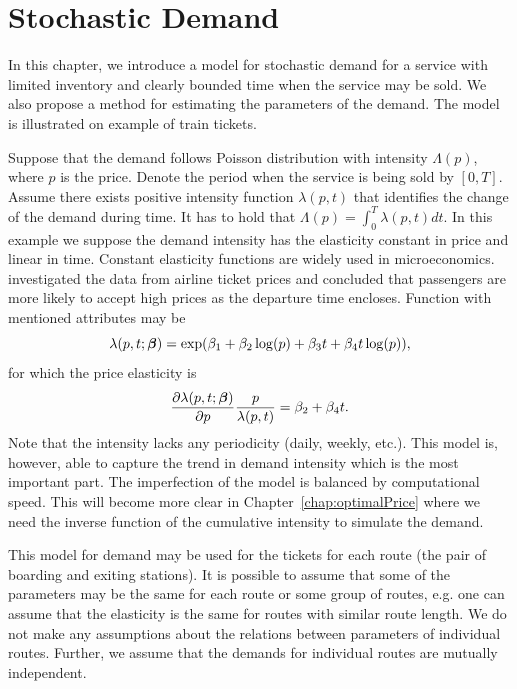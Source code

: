 \chapter{Stochastic Demand}
	\label{chap:Demand}

In this chapter, we introduce a model for stochastic demand for a service with limited inventory and clearly bounded time when the service may be sold. We also propose a method for estimating the parameters of the demand. The model is illustrated on example of train tickets.

Suppose that the demand follows Poisson distribution with intensity $\Lambda (p)$, where $p$ is the price. Denote the period when the service is being sold by $[0, T]$. Assume there exists positive intensity function $\lambda (p,t)$ that identifies the change of the demand during time. It has to hold that $\Lambda (p) = \int_0^T \lambda (p,t) dt$. In this example we suppose the demand intensity has the elasticity constant in price and linear in time. Constant elasticity functions are widely used in microeconomics. \cite{Williams13} investigated the data from airline ticket prices and concluded that passengers are more likely to accept high prices as the departure time encloses. Function with mentioned attributes may be
\begin{equation}
	\label{eq:demandModel}
	\lambda (p, t; \bm{\beta}) = \exp (\beta_1 + \beta_2 \log (p) + \beta_3 t + \beta_4 t \log (p)),
\end{equation}
for which the price elasticity is
\[
	\frac{\partial \lambda (p,t; \bm{\beta})}{\partial p} \frac{p}{\lambda (p,t)} = \beta_2 + \beta_4 t.
\]
Note that the intensity lacks any periodicity (daily, weekly, etc.). This model is, however, able to capture the trend in demand intensity which is the most important part. The imperfection of the model is balanced by computational speed. This will become more clear in Chapter~\ref{chap:optimalPrice} where we need the inverse function of the cumulative intensity to simulate the demand.

This model for demand may be used for the tickets for each route (the pair of boarding and exiting stations). It is possible to assume that some of the parameters may be the same for each route or some group of routes, e.g. one can assume that the elasticity is the same for routes with similar route length. We do not make any assumptions about the relations between parameters of individual routes. Further, we assume that the demands for individual routes are mutually independent.

